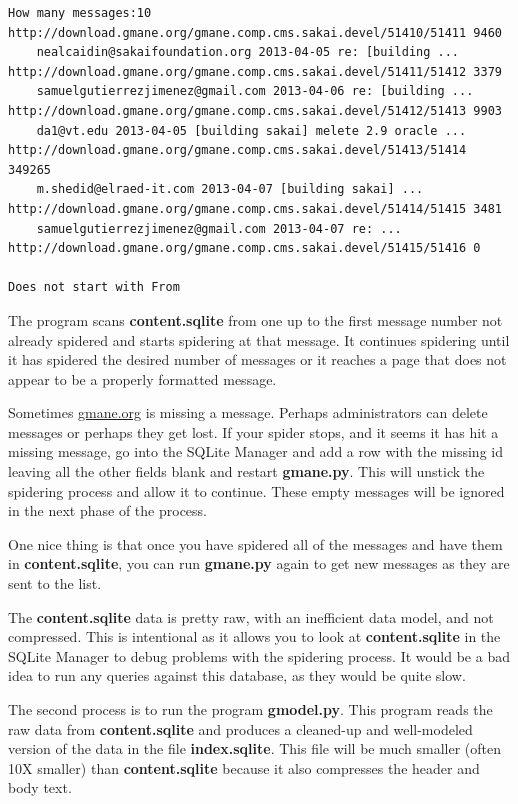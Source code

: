 \beforeverb
\begin{verbatim}
How many messages:10
http://download.gmane.org/gmane.comp.cms.sakai.devel/51410/51411 9460
    nealcaidin@sakaifoundation.org 2013-04-05 re: [building ...
http://download.gmane.org/gmane.comp.cms.sakai.devel/51411/51412 3379
    samuelgutierrezjimenez@gmail.com 2013-04-06 re: [building ...
http://download.gmane.org/gmane.comp.cms.sakai.devel/51412/51413 9903
    da1@vt.edu 2013-04-05 [building sakai] melete 2.9 oracle ...
http://download.gmane.org/gmane.comp.cms.sakai.devel/51413/51414 349265
    m.shedid@elraed-it.com 2013-04-07 [building sakai] ...
http://download.gmane.org/gmane.comp.cms.sakai.devel/51414/51415 3481
    samuelgutierrezjimenez@gmail.com 2013-04-07 re: ...
http://download.gmane.org/gmane.comp.cms.sakai.devel/51415/51416 0

Does not start with From 
\end{verbatim}
\afterverb
%
The program scans {\bf content.sqlite} from one up to the first message number not
already spidered and starts spidering at that message.  It continues spidering
until it has spidered the desired number of messages or it reaches a page
that does not appear to be a properly formatted message.

Sometimes \url{gmane.org} is missing a message.  Perhaps administrators can delete messages
or perhaps they get lost.   If your spider stops, and it seems it has hit
a missing message, go into the SQLite Manager and add a row with the missing id leaving
all the other fields blank and restart {\bf gmane.py}.   This will unstick the 
spidering process and allow it to continue.  These empty messages will be ignored in the next
phase of the process.

One nice thing is that once you have spidered all of the messages and have them in 
{\bf content.sqlite}, you can run {\bf gmane.py} again to get new messages as 
they are sent to the list.  

The {\bf content.sqlite} data is pretty raw, with an inefficient data model, 
and not compressed.
This is intentional as it allows you to look at {\bf content.sqlite}
in the SQLite Manager to debug problems with the spidering process.
It would be a bad idea to run any queries against this database, as they 
would be quite slow.

The second process is to run the program {\bf gmodel.py}.  This program reads the raw 
data from {\bf content.sqlite} and produces a cleaned-up and well-modeled version of the 
data in the file {\bf index.sqlite}.  This file will be much smaller (often 10X
smaller) than {\bf content.sqlite} because it also compresses the header and body text.

